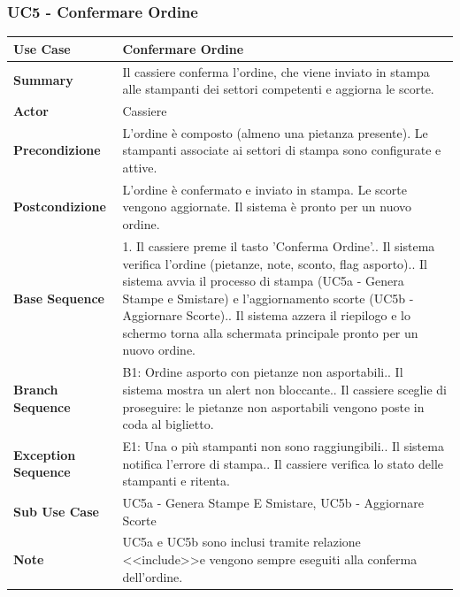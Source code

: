 \newpage 
\subsubsection*{UC5 - Confermare Ordine}
\begin{center}
\begin{tabular}{|p{}|p{}|}
\hline
\textbf{Use Case} & Confermare Ordine \\ \hline
\textbf{Summary} & Il cassiere conferma l'ordine, che viene inviato in stampa alle stampanti dei settori competenti e aggiorna le scorte. \\ \hline
\textbf{Actor} & Cassiere \\ \hline
\textbf{Precondizione} & L'ordine è composto (almeno una pietanza presente). Le stampanti associate ai settori di stampa sono configurate e attive. \\ \hline
\textbf{Postcondizione} & L'ordine è confermato e inviato in stampa. Le scorte vengono aggiornate. Il sistema è pronto per un nuovo ordine. \\ \hline
\textbf{Base Sequence} & 1. Il cassiere preme il tasto 'Conferma Ordine'.\newline 2. Il sistema verifica l'ordine (pietanze, note, sconto, flag asporto).\newline 3. Il sistema avvia il processo di stampa (UC5a - Genera Stampe e Smistare) e l'aggiornamento scorte (UC5b - Aggiornare Scorte).\newline 4. Il sistema azzera il riepilogo e lo schermo torna alla schermata principale pronto per un nuovo ordine. \\ \hline
\textbf{Branch Sequence} & B1: Ordine asporto con pietanze non asportabili.\newline 2. Il sistema mostra un alert non bloccante.\newline 3. Il cassiere sceglie di proseguire: le pietanze non asportabili vengono poste in coda al biglietto. \\ \hline
\textbf{Exception Sequence} & E1: Una o più stampanti non sono raggiungibili.\newline 3. Il sistema notifica l'errore di stampa.\newline 4. Il cassiere verifica lo stato delle stampanti e ritenta. \\ \hline
\textbf{Sub Use Case} & UC5a - Genera Stampe E Smistare, UC5b - Aggiornare Scorte \\ \hline
\textbf{Note} & UC5a e UC5b sono inclusi tramite relazione \textless\textless include\textgreater\textgreater e vengono sempre eseguiti alla conferma dell'ordine. \\ \hline
\end{tabular}
\end{center}


